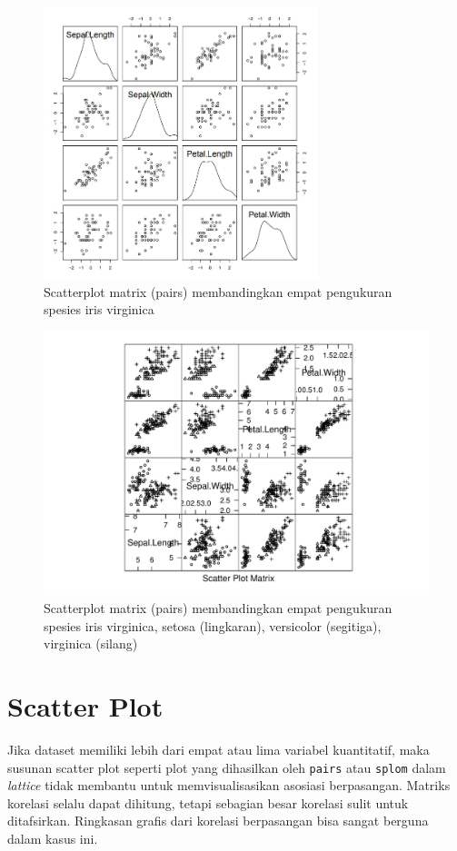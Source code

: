 \documentclass[a4paper,12pt]{article}
\theoremstyle{definition}
\begin{document}
    \begin{figure}[H]
    \centering
    \includegraphics [width=8cm]{gb/K2G1}
    \caption{Scatterplot matrix (pairs) membandingkan empat pengukuran
    spesies iris virginica}
    \label{fig:my_label}
\end{figure}

\begin{figure}[H]
    \centering
    \includegraphics[width=16cm]{gb/K2G2-Scatterplot.pdf}
    \caption{Scatterplot matrix (pairs) membandingkan empat pengukuran
    spesies iris virginica, setosa (lingkaran), versicolor (segitiga), virginica (silang)}
    \label{fig:my_label}
\end{figure}

\section{Scatter Plot}
Jika dataset memiliki lebih dari empat atau lima variabel kuantitatif, maka susunan scatter plot seperti plot yang dihasilkan oleh \texttt{pairs} atau \texttt{splom} dalam \textit{lattice} tidak membantu untuk memvisualisasikan asosiasi berpasangan. Matriks korelasi selalu dapat dihitung, tetapi sebagian besar korelasi sulit untuk ditafsirkan. Ringkasan grafis dari korelasi berpasangan bisa sangat berguna dalam kasus ini.
\end{document}
